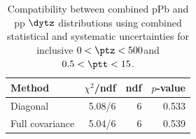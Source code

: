 \begin{table}[htp!]
\centering
\begin{tabular}{|l|r|r|r|}
\hline
Method & $\chi^2$/ndf & ndf & $p$-value \\
\hline
Diagonal & 5.08/6 & 6 & 0.533 \\
Full covariance & 5.04/6 & 6 & 0.539 \\
\hline
\end{tabular}
\caption{Compatibility between combined pPb and pp $\dytz$ distributions using combined statistical and systematic uncertainties for inclusive $0 < \ptz < 500$\GeV and $0.5 < \ptt < 15$\GeV.}
\label{table:chisq_deta}
\end{table}
